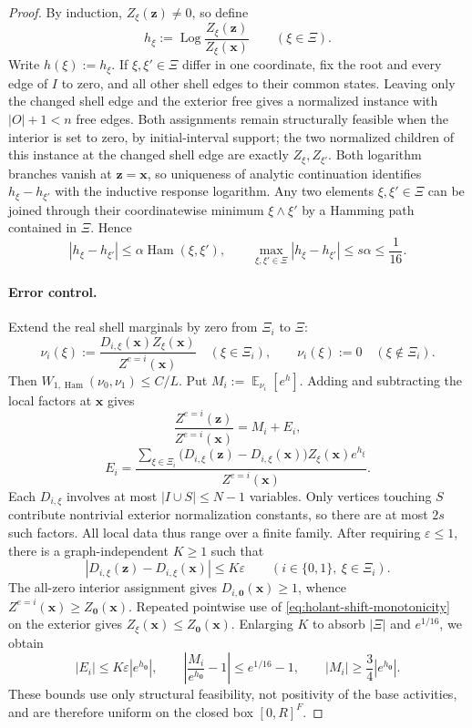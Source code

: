 \documentclass[11pt,reqno]{article}
\theoremstyle{plain}
\theoremstyle{definition}
\theoremstyle{remark}
\theoremstyle{definition}
\theoremstyle{remark}
\newcommand{\eps}{\varepsilon}
\newcommand{\Log}{\operatorname{Log}}          %
\DeclareMathOperator{\E}{\mathbb{E}}
\DeclareMathOperator{\Ham}{Ham}
\newcommand{\WHam}{W_{1,\Ham}}                   %
\begin{document}
\begin{proof}
By induction, \(Z_\xi(\mathbf z)\ne0\), so define
\[
  h_\xi:=\Log\frac{Z_\xi(\mathbf z)}{Z_\xi(\mathbf x)}
  \qquad(\xi\in\Xi).
\]
Write \(h(\xi):=h_\xi\).  If
\(\xi,\xi'\in\Xi\) differ in one coordinate, fix the root and every
edge of \(I\) to zero, and
all other shell edges to their common states.  Leaving only the changed
shell edge and the exterior free gives a normalized instance with
\(|O|+1<n\) free edges.  Both assignments remain structurally feasible
when the interior is set to zero, by initial-interval support; the two
normalized children of this instance at the changed shell edge are
exactly \(Z_\xi,Z_{\xi'}\).
Both logarithm branches vanish at \(\mathbf z=\mathbf x\), so uniqueness
of analytic continuation identifies \(h_\xi-h_{\xi'}\) with the
inductive response logarithm.  Any two elements \(\xi,\xi'\in\Xi\) can be
joined through their coordinatewise minimum \(\xi\wedge\xi'\) by a Hamming path contained in
\(\Xi\).  Hence
\[
  |h_\xi-h_{\xi'}|\le\alpha\Ham(\xi,\xi'),
  \qquad
  \max_{\xi,\xi'\in\Xi}|h_\xi-h_{\xi'}|
     \le s\alpha\le\frac1{16}.
\]

\paragraph{Error control.}
Extend the real shell marginals by zero from \(\Xi_i\) to \(\Xi\):
\[
  \nu_i(\xi):=
  \frac{D_{i,\xi}(\mathbf x)Z_\xi(\mathbf x)}
       {Z^{e=i}(\mathbf x)}
  \quad(\xi\in\Xi_i),
  \qquad
  \nu_i(\xi):=0\quad(\xi\notin\Xi_i).
\]
Then \(\WHam(\nu_0,\nu_1)\le C/L\).  Put
\(M_i:=\E_{\nu_i}[e^h]\).  Adding and subtracting the local factors at
\(\mathbf x\) gives
\[
  \frac{Z^{e=i}(\mathbf z)}{Z^{e=i}(\mathbf x)}=M_i+E_i,
\]
\[
  E_i=
  \frac{\displaystyle\sum_{\xi\in\Xi_i}
    \bigl(D_{i,\xi}(\mathbf z)-D_{i,\xi}(\mathbf x)\bigr)
    Z_\xi(\mathbf x)e^{h_\xi}}
       {Z^{e=i}(\mathbf x)}.
\]
Each \(D_{i,\xi}\) involves at most \(|I\cup S|\le N-1\) variables.
Only vertices touching \(S\) contribute nontrivial exterior normalization
constants, so there are at most \(2s\) such factors.  All local data
thus range over a finite family.  After requiring \(\eps\le1\), there is
a graph-independent \(K\ge1\) such that
\[
  |D_{i,\xi}(\mathbf z)-D_{i,\xi}(\mathbf x)|\le K\eps
  \qquad(i\in\{0,1\},\ \xi\in\Xi_i).
\]
The all-zero interior assignment gives \(D_{i,\mathbf0}(\mathbf x)\ge1\), whence
\(Z^{e=i}(\mathbf x)\ge Z_{\mathbf0}(\mathbf x)\).  Repeated pointwise
use of \eqref{eq:holant-shift-monotonicity} on the exterior gives
\(Z_\xi(\mathbf x)\le Z_{\mathbf0}(\mathbf x)\).  Enlarging \(K\) to
absorb \(|\Xi|\) and \(e^{1/16}\), we obtain
\[
  |E_i|\le K\eps|e^{h_{\mathbf0}}|,
  \qquad
  \left|\frac{M_i}{e^{h_{\mathbf0}}}-1\right|
       \le e^{1/16}-1,
  \qquad
  |M_i|\ge\frac34|e^{h_{\mathbf0}}|.
\]
These bounds use only structural feasibility, not positivity of the
base activities, and are therefore uniform on the closed box
\([0,R]^F\).


\end{proof}
\end{document}
